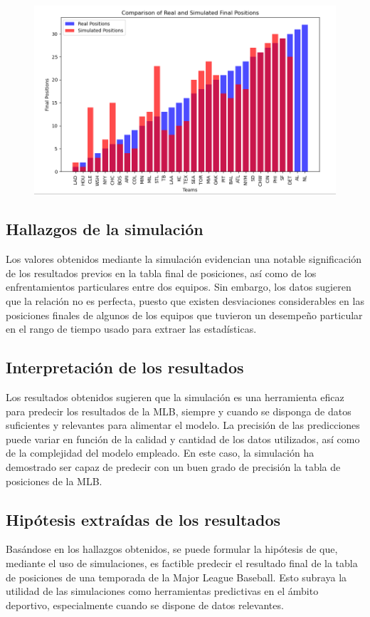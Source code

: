 \documentclass{article}
\begin{document}
        \begin{figure}[h!]
            \begin{center}	
                \includegraphics[width=1.0\linewidth]{bar_chart.png}
            \end{center}
        \end{figure}

        \subsection{Hallazgos de la simulación}
            Los valores obtenidos mediante la simulación evidencian una notable significación de los resultados previos en la tabla final de posiciones, así como de los enfrentamientos particulares entre dos equipos. Sin embargo, los datos sugieren que la relación no es perfecta, puesto que existen desviaciones considerables en las posiciones finales de algunos de los equipos que tuvieron un desempeño particular en el rango de tiempo usado para extraer las estadísticas.
        \subsection{Interpretación de los resultados}
            Los resultados obtenidos sugieren que la simulación es una herramienta eficaz para predecir los resultados de la MLB, siempre y cuando se disponga de datos suficientes y relevantes para alimentar el modelo. La precisión de las predicciones puede variar en función de la calidad y cantidad de los datos utilizados, así como de la complejidad del modelo empleado. En este caso, la simulación ha demostrado ser capaz de predecir con un buen grado de precisión la tabla de posiciones de la MLB.
        \subsection{Hipótesis extraídas de los resultados}
            Basándose en los hallazgos obtenidos, se puede formular la hipótesis de que, mediante el uso de simulaciones, es factible predecir el resultado final de la tabla de posiciones de una temporada de la Major League Baseball. Esto subraya la utilidad de las simulaciones como herramientas predictivas en el ámbito deportivo, especialmente cuando se dispone de datos relevantes.
\end{document}
